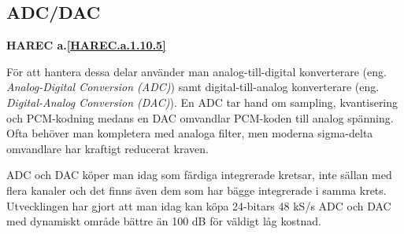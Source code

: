 \subsection{ADC/DAC}
\textbf{HAREC a.\ref{HAREC.a.1.10.5}\label{myHAREC.a.1.10.5}}

\begin{rev-nytt}[MAD]

För att hantera dessa delar använder man analog-till-digital konverterare
(eng. \emph{Analog-Digital Conversion (ADC)}) samt digital-till-analog
konverterare (eng. \emph{Digital-Analog Conversion (DAC)}). En ADC tar hand om
sampling, kvantisering och PCM-kodning medans en DAC omvandlar PCM-koden till
analog spänning. Ofta behöver man kompletera med analoga filter, men moderna
sigma-delta omvandlare har kraftigt reducerat kraven.

ADC och DAC köper man idag som färdiga integrerade kretsar, inte sällan med
flera kanaler och det finns även dem som har bägge integrerade i samma krets.
Utvecklingen har gjort att man idag kan köpa 24-bitars 48 kS/s ADC och DAC med
dynamiskt område bättre än 100 dB för väldigt låg kostnad.

\end{rev-nytt}
